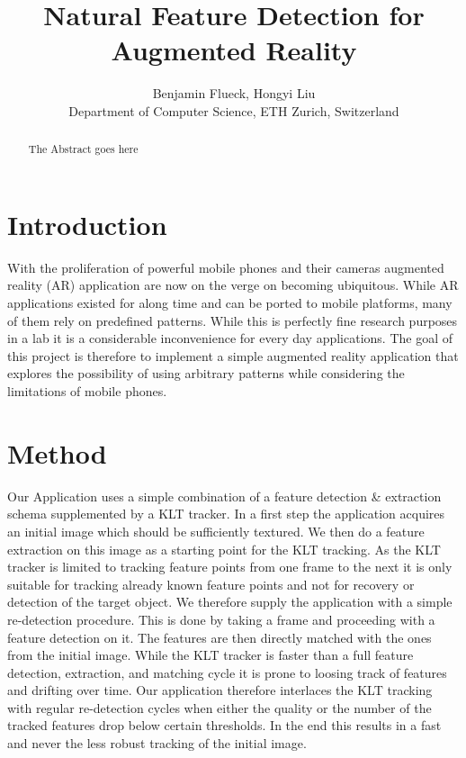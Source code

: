 \documentclass[10pt,conference,compsocconf]{IEEEtran}
\begin{document}
\title{Natural Feature Detection for Augmented Reality}

\author{
  Benjamin Flueck, Hongyi Liu\\
  Department of Computer Science, ETH Zurich, Switzerland\\
}

\maketitle

\begin{abstract}
The Abstract goes here
\end{abstract}

\section{Introduction}

With the proliferation of powerful mobile phones and their cameras augmented reality (AR) application are now on the verge on becoming ubiquitous. While AR applications existed for along time and can be ported to mobile platforms, many of them rely on predefined patterns. While this is perfectly fine research purposes in a lab it is a considerable inconvenience for every day applications. The goal of this project is therefore to implement a simple augmented reality application that explores the possibility of using arbitrary patterns while considering the limitations of mobile phones.

\section{Method}

Our Application uses a simple combination of a feature detection \& extraction schema supplemented by a KLT tracker. In a first step the application acquires an initial image which should be sufficiently textured. We then do a feature extraction on this image as a starting point for the KLT tracking. As the KLT tracker is limited to  tracking feature points from one frame to the next it is only suitable for tracking already known feature points and not for recovery or detection of the target object. We therefore supply the application with a simple re-detection procedure. This is done by taking a frame and proceeding with a feature detection on it. The features are then directly matched with the ones from the initial image. While the KLT tracker is faster than a full feature detection, extraction, and matching cycle it is prone to loosing track of features and drifting over time. Our application therefore interlaces the KLT tracking with regular re-detection cycles when either the quality or the number of the tracked features drop below certain thresholds. In the end this results in a fast and never the less robust tracking of the initial image.
\end{document}

